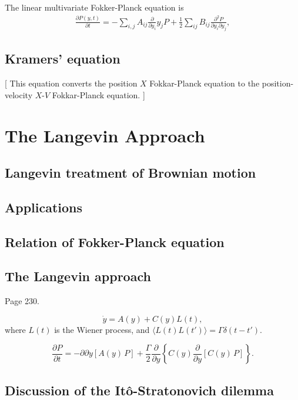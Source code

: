 \documentclass{book}
\numberwithin{equation}{section}
\theoremstyle{plain}
\theoremstyle{definition}
\theoremstyle{remark}
\begin{document}
The linear multivariate Fokker-Planck equation is
\begin{align}
\frac{  \partial P(y, t) } { \partial t }
=
-\sum_{i,j} A_{ij} \frac{ \partial } { \partial y_i } y_j P
+ \frac 1 2 \sum_{ij} B_{ij} \frac{ \partial^2 P } { \partial y_i \partial y_j },
\tag{6.4}
\end{align}

\section{Kramers' equation}

[
  This equation converts the position $X$ Fokkar-Planck equation
  to the position-velocity $X$-$V$ Fokkar-Planck equation.
]

\chapter{The Langevin Approach}

\section{Langevin treatment of Brownian motion}

\section{Applications}

\section{Relation of Fokker-Planck equation}

\section{The Langevin approach}

Page 230.

$$
\dot y = A(y) + C(y) L(t),
$$
where $L(t)$ is the Wiener process,
and $\langle L(t) L(t') \rangle = \Gamma \delta(t - t')$.


$$
\frac{ \partial P }{ \partial t }
=
-{ \partial } { \partial y } [ A(y) \, P ]
+
\frac{ \Gamma } { 2 } \frac{ \partial } { \partial y }
\left\{
  C(y)
  \frac{ \partial } { \partial y } [ C(y) \, P ]
\right\}.
$$

\section{Discussion of the It\^o-Stratonovich dilemma}
\end{document}
